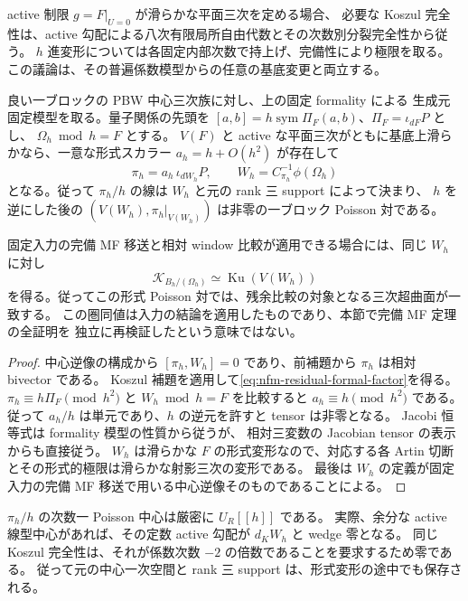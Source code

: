 active 制限 $g=F|_{U=0}$ が滑らかな平面三次を定める場合、
必要な Koszul 完全性は、active 勾配による八次有限局所自由代数とその次数別分裂完全性から従う。
$h$ 進変形については各固定内部次数で持上げ、完備性により極限を取る。
この議論は、その普遍係数模型からの任意の基底変更と両立する。

\begin{theorem}
\label{thm:nfm-residual-formal-poisson}
良い一ブロックの PBW 中心三次族に対し、上の固定 formality による
生成元固定模型を取る。量子関係の先頭を
$[a,b]=h\operatorname{sym}\Pi_F(a,b)$、$\Pi_F=\iota_{dF}P$ とし、
$\Omega_h\bmod h=F$ とする。
$V(F)$ と active な平面三次がともに基底上滑らかなら、一意な形式スカラー $a_h=h+O(h^2)$ が存在して
\begin{equation}
\label{eq:nfm-residual-formal-factor}
 \pi_h=a_h\,\iota_{dW_h}P,
 \qquad W_h=C_{\pi_h}^{-1}\phi(\Omega_h)
\end{equation}
となる。従って $\pi_h/h$ の線は $W_h$ と元の rank 三 support によって決まり、
$h$ を逆にした後の $(V(W_h),\pi_h|_{V(W_h)})$ は非零の一ブロック Poisson 対である。

固定入力の完備 MF 移送と相対 window 比較が適用できる場合には、同じ $W_h$ に対し
\[
 \mathcal K_{B_h/(\Omega_h)}\simeq\operatorname{Ku}(V(W_h))
\]
を得る。従ってこの形式 Poisson 対では、残余比較の対象となる三次超曲面が一致する。
この圏同値は入力の結論を適用したものであり、本節で完備 MF 定理の全証明を
独立に再検証したという意味ではない。
\end{theorem}

\begin{proof}
中心逆像の構成から $[\pi_h,W_h]=0$ であり、前補題から $\pi_h$ は相対 bivector である。
Koszul 補題を適用して\eqref{eq:nfm-residual-formal-factor}を得る。
$\pi_h\equiv h\Pi_F\pmod{h^2}$ と $W_h\bmod h=F$ を比較すると
$a_h\equiv h\pmod{h^2}$ である。
従って $a_h/h$ は単元であり、$h$ の逆元を許すと tensor は非零となる。
Jacobi 恒等式は formality 模型の性質から従うが、
相対三変数の Jacobian tensor の表示からも直接従う。
$W_h$ は滑らかな $F$ の形式変形なので、対応する各 Artin 切断とその形式的極限は滑らかな射影三次の変形である。
最後は $W_h$ の定義が固定入力の完備 MF 移送で用いる中心逆像そのものであることによる。
\end{proof}

$\pi_h/h$ の次数一 Poisson 中心は厳密に $U_R[[h]]$ である。
実際、余分な active 線型中心があれば、その定数 active 勾配が
$d_KW_h$ と wedge 零となる。
同じ Koszul 完全性は、それが係数次数 $-2$ の倍数であることを要求するため零である。
従って元の中心一次空間と rank 三 support は、形式変形の途中でも保存される。

